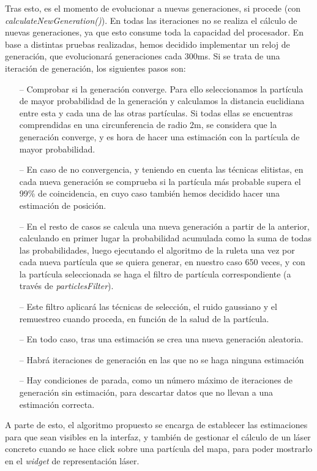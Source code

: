 Tras esto, es el momento de evolucionar a nuevas generaciones, si procede (con \textit{calculateNewGeneration()}). En todas las iteraciones no se realiza el cálculo de nuevas generaciones, ya que esto consume toda la capacidad del procesador. En base a distintas pruebas realizadas, hemos decidido implementar un reloj de generación, que evolucionará generaciones cada 300ms.
Si se trata de una iteración de generación, los siguientes pasos son:

\begin{itemize}
	\item[--] Comprobar si la generación converge. Para ello seleccionamos la partícula de mayor probabilidad de la generación y calculamos la distancia euclidiana entre esta y cada una de las otras partículas. Si todas ellas se encuentras comprendidas en una circunferencia de radio 2m, se considera que la generación converge, y es hora de hacer una estimación con la partícula de mayor probabilidad.
	\item[--] En caso de no convergencia, y teniendo en cuenta las técnicas elitistas, en cada nueva generación se comprueba si la partícula más probable supera el 99\% de coincidencia, en cuyo caso también hemos decidido hacer una estimación de posición.
	\item[--] En el resto de casos se calcula una nueva generación a partir de la anterior, calculando en primer lugar la probabilidad acumulada como la suma de todas las probabilidades, luego ejecutando el algoritmo de la ruleta una vez por cada nueva partícula que se quiera generar, en nuestro caso 650 veces, y con la partícula seleccionada se haga el filtro de partícula correspondiente (a través de \textit{particlesFilter}).
	\item[--] Este filtro aplicará las técnicas de selección, el ruido gaussiano y el remuestreo cuando proceda, en función de la salud de la partícula.
	\item[--] En todo caso, tras una estimación se crea una nueva generación aleatoria.
	\item[--] Habrá iteraciones de generación en las que no se haga ninguna estimación
	\item[--] Hay condiciones de parada, como un número máximo de iteraciones de generación sin estimación, para descartar datos que no llevan a una estimación correcta. 
\end{itemize}

A parte de esto, el algoritmo propuesto se encarga de establecer las estimaciones para que sean visibles en la interfaz, y también de gestionar el cálculo de un láser concreto cuando se hace click sobre una partícula del mapa, para poder mostrarlo en el \textit{widget} de representación láser.

